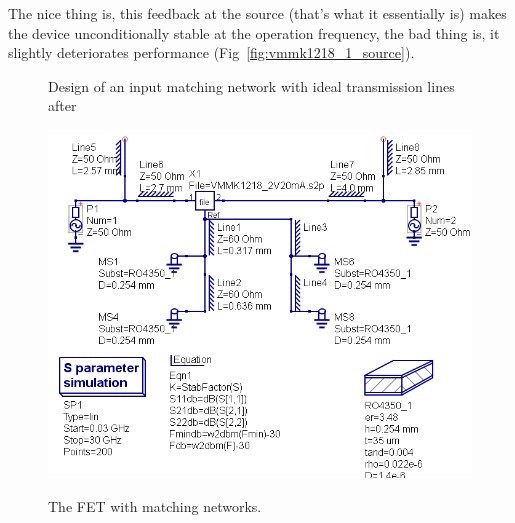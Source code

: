 The nice thing is, this feedback at the source (that's what it
essentially is) makes the device unconditionally stable at the
operation frequency, the bad thing is, it slightly deteriorates
performance (Fig~\ref{fig:vmmk1218_1_source}). 

\label{ch:match1}

\begin{figure}
  \centering
  \caption{Design of an input matching network with ideal transmission
    lines after \cite{ibdrigodwn}}
  \label{fig:vmmk1218_input_match}
\end{figure}

\begin{figure}
  \centering
  {\includegraphics[width=12cm]{vmmk1218_matching.png}}
  \caption{The FET with matching networks.}
  \label{fig:vmmk1218_matching}
\end{figure}

